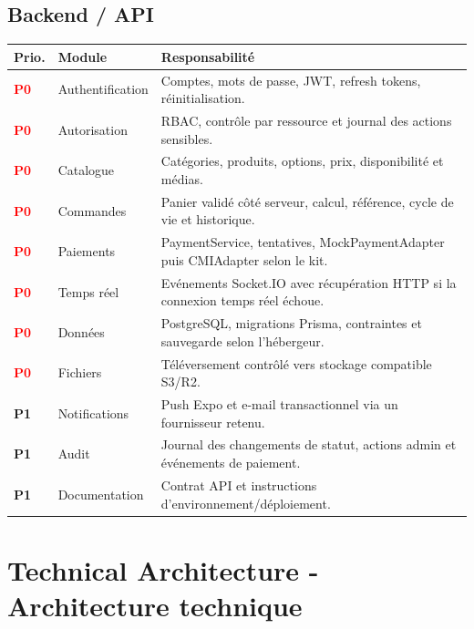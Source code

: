 \documentclass[10pt,a4paper]{article}
\newcommand{\tagbox}[2]{\colorbox{#1!14}{\textcolor{#1}{\textbf{\scriptsize #2}}}}
\newcommand{\Pzero}{\tagbox{red}{P0}}
\newcommand{\Pone}{\tagbox{amber}{P1}}
\begin{document}
\subsection{Backend / API}
\begin{longtable}{@{}L{1.1cm}L{4cm}L{10cm}@{}}
\toprule
\textbf{Prio.} & \textbf{Module} & \textbf{Responsabilité} \\
\midrule
\endhead
\Pzero & Authentification & Comptes, mots de passe, JWT, refresh tokens, réinitialisation. \\
\Pzero & Autorisation & RBAC, contrôle par ressource et journal des actions sensibles. \\
\Pzero & Catalogue & Catégories, produits, options, prix, disponibilité et médias. \\
\Pzero & Commandes & Panier validé côté serveur, calcul, référence, cycle de vie et historique. \\
\Pzero & Paiements & PaymentService, tentatives, MockPaymentAdapter puis CMIAdapter selon le kit. \\
\Pzero & Temps réel & Evénements Socket.IO avec récupération HTTP si la connexion temps réel échoue. \\
\Pzero & Données & PostgreSQL, migrations Prisma, contraintes et sauvegarde selon l'hébergeur. \\
\Pzero & Fichiers & Téléversement contrôlé vers stockage compatible S3/R2. \\
\Pone & Notifications & Push Expo et e-mail transactionnel via un fournisseur retenu. \\
\Pone & Audit & Journal des changements de statut, actions admin et événements de paiement. \\
\Pone & Documentation & Contrat API et instructions d'environnement/déploiement. \\
\bottomrule
\end{longtable}

\section{Technical Architecture - Architecture technique}
\end{document}
